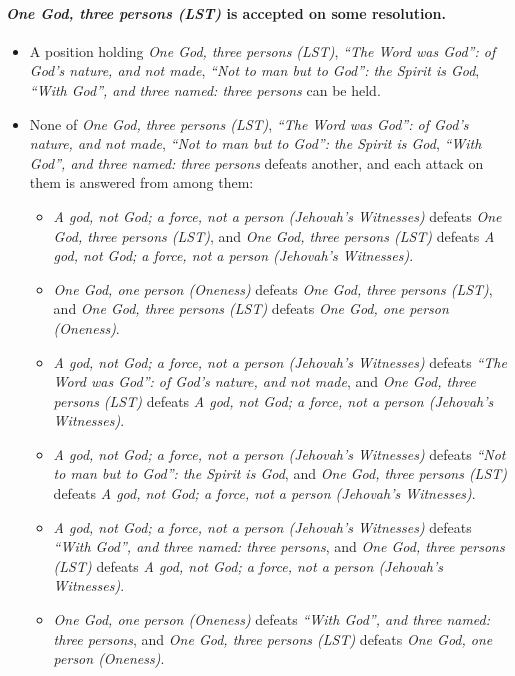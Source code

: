 \documentclass[11pt,paper=\testimonypaper,DIV=13,parskip=false]{scrartcl}
\begin{document}
\paragraph{\emph{One God, three persons (LST)} is accepted on some resolution.}
\begin{itemize}
\item A position holding \emph{One God, three persons (LST)}, \emph{“The Word was God”: of God’s nature, and not made}, \emph{“Not to man but to God”: the Spirit is God}, \emph{“With God”, and three named: three persons} can be held.
\item None of \emph{One God, three persons (LST)}, \emph{“The Word was God”: of God’s nature, and not made}, \emph{“Not to man but to God”: the Spirit is God}, \emph{“With God”, and three named: three persons} defeats another, and each attack on them is answered from among them:
\begin{itemize}
\item \emph{A god, not God; a force, not a person (Jehovah’s Witnesses)} defeats \emph{One God, three persons (LST)}, and \emph{One God, three persons (LST)} defeats \emph{A god, not God; a force, not a person (Jehovah’s Witnesses)}.
\item \emph{One God, one person (Oneness)} defeats \emph{One God, three persons (LST)}, and \emph{One God, three persons (LST)} defeats \emph{One God, one person (Oneness)}.
\item \emph{A god, not God; a force, not a person (Jehovah’s Witnesses)} defeats \emph{“The Word was God”: of God’s nature, and not made}, and \emph{One God, three persons (LST)} defeats \emph{A god, not God; a force, not a person (Jehovah’s Witnesses)}.
\item \emph{A god, not God; a force, not a person (Jehovah’s Witnesses)} defeats \emph{“Not to man but to God”: the Spirit is God}, and \emph{One God, three persons (LST)} defeats \emph{A god, not God; a force, not a person (Jehovah’s Witnesses)}.
\item \emph{A god, not God; a force, not a person (Jehovah’s Witnesses)} defeats \emph{“With God”, and three named: three persons}, and \emph{One God, three persons (LST)} defeats \emph{A god, not God; a force, not a person (Jehovah’s Witnesses)}.
\item \emph{One God, one person (Oneness)} defeats \emph{“With God”, and three named: three persons}, and \emph{One God, three persons (LST)} defeats \emph{One God, one person (Oneness)}.
\end{itemize}
\end{itemize}
\end{document}
